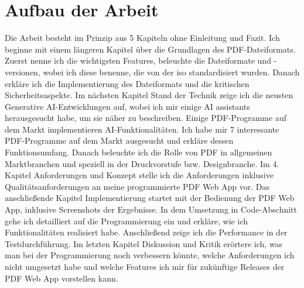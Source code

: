 \section{Aufbau der Arbeit}
Die Arbeit besteht im Prinzip aus 5 Kapiteln ohne Einleitung und Fazit. Ich beginne mit einem längeren Kapitel über die Grundlagen des PDF-Dateiformats. Zuerst nenne ich die wichtigsten Features, beleuchte die Dateiformate und -versionen, wobei ich diese benenne, die von der \gls{iso} standardisiert wurden. Danach erkläre ich die Implementierung des Dateiformats und die kritischen Sicherheitsaspekte. Im nächsten Kapitel Stand der Technik zeige ich die neusten Generative AI-Entwicklungen auf, wobei ich mir einige AI assistants herausgesucht habe, um sie näher zu beschreiben. Einige PDF-Programme auf dem Markt implementieren AI-Funktionalitäten. Ich habe mir 7 interessante PDF-Programme auf dem Markt ausgesucht und erkläre dessen Funktionsumfang. Danach beleuchte ich die Rolle von PDF in allgemeinen Marktbranchen und speziell in der Druckvorstufe bzw. Designbranche. Im 4. Kapitel Anforderungen und Konzept stelle ich die Anforderungen inklusive Qualitätsanforderungen an meine programmierte PDF Web App vor. Das anschließende Kapitel Implementierung startet mit der Bedienung der PDF Web App, inklusive Screenshots der Ergebnisse. In dem Umsetzung in Code-Abschnitt gehe ich detailliert auf die Programmierung ein und erkläre, wie ich Funktionalitäten realisiert habe. Anschließend zeige ich die Performance in der Testdurchführung. Im letzten Kapitel Diskussion und Kritik erörtere ich, was man bei der Programmierung noch verbessern könnte, welche Anforderungen ich nicht umgesetzt habe und welche Features ich mir für zukünftige Releases der PDF Web App vorstellen kann. 